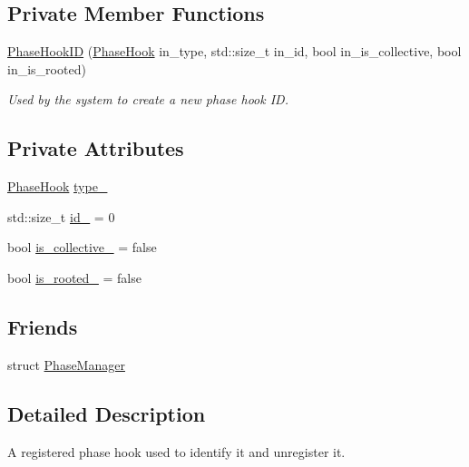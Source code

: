 \subsection*{Private Member Functions}
\begin{DoxyCompactItemize}
\item 
\hyperlink{structvt_1_1phase_1_1_phase_hook_i_d_a2671882c570d309ddfb2301bdc773f26}{Phase\+Hook\+ID} (\hyperlink{namespacevt_1_1phase_aec9a63fdd99680d7a7fe99d321193811}{Phase\+Hook} in\+\_\+type, std\+::size\+\_\+t in\+\_\+id, bool in\+\_\+is\+\_\+collective, bool in\+\_\+is\+\_\+rooted)
\begin{DoxyCompactList}\small\item\em Used by the system to create a new phase hook ID. \end{DoxyCompactList}\end{DoxyCompactItemize}
\subsection*{Private Attributes}
\begin{DoxyCompactItemize}
\item 
\hyperlink{namespacevt_1_1phase_aec9a63fdd99680d7a7fe99d321193811}{Phase\+Hook} \hyperlink{structvt_1_1phase_1_1_phase_hook_i_d_a6c2f927ed509d68a0acd18c47f47679b}{type\+\_\+}
\item 
std\+::size\+\_\+t \hyperlink{structvt_1_1phase_1_1_phase_hook_i_d_afccddafce973b00c55d3ac4e7c4635d5}{id\+\_\+} = 0
\item 
bool \hyperlink{structvt_1_1phase_1_1_phase_hook_i_d_a56d0ba883374ef1eb57dcbbb094511da}{is\+\_\+collective\+\_\+} = false
\item 
bool \hyperlink{structvt_1_1phase_1_1_phase_hook_i_d_a88e238f6a6411dc0974e93a0b4972833}{is\+\_\+rooted\+\_\+} = false
\end{DoxyCompactItemize}
\subsection*{Friends}
\begin{DoxyCompactItemize}
\item 
struct \hyperlink{structvt_1_1phase_1_1_phase_hook_i_d_a346e5d84677fffb1e9f1f393b7d13779}{Phase\+Manager}
\end{DoxyCompactItemize}


\subsection{Detailed Description}
A registered phase hook used to identify it and unregister it. 

